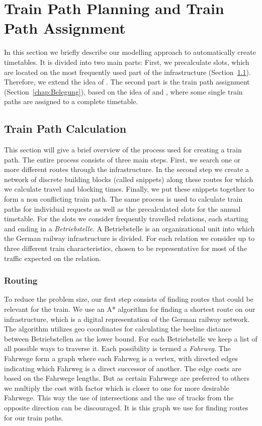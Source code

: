 \section{Train Path Planning and Train Path Assignment}
\label{chap:methods}
%
In this section we briefly describe our modelling approach to automatically create timetables. It is divided into two main parts: First, we precalculate slots, which are located on the most frequently used part of the infrastructure (Section~\ref{chap:Konstruktion}). Therefore, we extend the idea of \cite{O:2009}. The second part is the train path assignment (Section~\ref{chap:Belegung}), based on the idea of \cite{N:1998, N:2015} and \cite{NO:2014}, where some single train paths are assigned to a complete timetable.


\subsection{Train Path Calculation}
\label{chap:Konstruktion}
%
This section will give a brief overview of the process used for creating a train path. The entire process consists of three main steps. First, we search one or more different routes through the infrastructure. In the second step we create a network of discrete building blocks (called snippets) along these routes for which we calculate travel and blocking times. Finally, we put these snippets together to form a non conflicting train path. The same process is used to calculate train paths for individual requests as well as the precalculated slots for the annual timetable. For the slots we consider frequently travelled relations, each starting and ending in a \emph{Betriebstelle}. A Betriebstelle is an organizational unit into which the German railway infrastructure is divided. For each relation we consider up to three different train characteristics, chosen to be representative for most of the traffic expected on the relation.


\subsubsection{Routing}
To reduce the problem size, our first step consists of finding routes that could be relevant for the train. We use an A* algorithm for finding a shortest route on our infrastructure, which is a digital representation of the German railway network. The algorithm utilizes geo coordinates for calculating the beeline distance between Betriebstellen as the lower bound.
For each Betriebstelle we keep a list of all possible ways to traverse it. Each possibility is termed a \emph{Fahrweg}. The Fahrwege form a graph where each Fahrweg is a vertex, with directed edges indicating which Fahrweg is a direct successor of another. The edge costs are based on the Fahrwege lengths.
But as certain Fahrwege are preferred to others we multiply the cost with factor which is closer to one for more desirable Fahrwege. This way the use of intersections and the use of tracks from the opposite direction can be discouraged. It is this graph we use for finding routes for our train paths.

